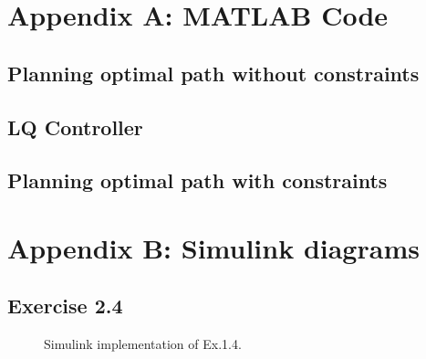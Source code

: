 
\begin{appendices}
\section{Appendix A: MATLAB Code}
\label{appendix:A}

\subsection{Planning optimal path without constraints}


\subsection{LQ Controller}


\subsection{Planning optimal path with constraints}




\section{Appendix B: Simulink diagrams}
\label{appendix:B}

\subsection*{Exercise 2.4}
\begin{figure}[h]
    \centering
    \caption{Simulink implementation of Ex.1.4.}
    \label{sim:ex24}
\end{figure}


\end{appendices}
